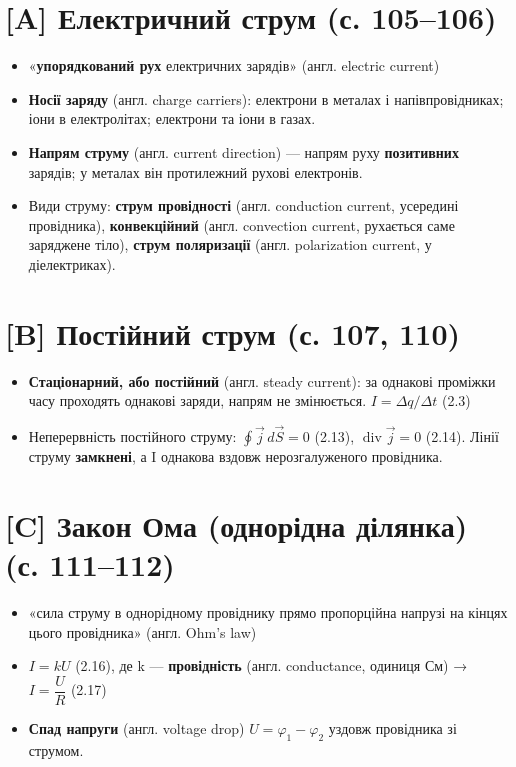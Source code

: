 \documentclass[11pt,a4paper,oneside]{book}
\begin{document}
\section*{[A] Електричний струм (с. 105–106)}
\begin{itemize}
\item «\textbf{упорядкований рух} електричних зарядів» (англ. electric current)
\item \textbf{Носії заряду} (англ. charge carriers): електрони в металах і напівпровідниках; іони в електролітах; електрони та іони в газах.
\item \textbf{Напрям струму} (англ. current direction) — напрям руху \textbf{позитивних} зарядів; у металах він протилежний рухові електронів.
\item Види струму: \textbf{струм провідності} (англ. conduction current, усередині провідника), \textbf{конвекційний} (англ. convection current, рухається саме заряджене тіло), \textbf{струм поляризації} (англ. polarization current, у діелектриках).
\end{itemize}

\section*{[B] Постійний струм (с. 107, 110)}
\begin{itemize}
\item \textbf{Стаціонарний, або постійний} (англ. steady current): за однакові проміжки часу проходять однакові заряди, напрям не змінюється. $I = \Delta q/\Delta t$ (2.3)
\item Неперервність постійного струму: $\oint \vec j\,d\vec S = 0$ (2.13), $\operatorname{div}\vec j = 0$ (2.14). Лінії струму \textbf{замкнені}, а I однакова вздовж нерозгалуженого провідника.
\end{itemize}

\section*{[C] Закон Ома (однорідна ділянка) (с. 111–112)}
\begin{itemize}
\item «сила струму в однорідному провіднику прямо пропорційна напрузі на кінцях цього провідника» (англ. Ohm's law)
\item $I = kU$ (2.16), де k — \textbf{провідність} (англ. conductance, одиниця См) → $I = \dfrac{U}{R}$ (2.17)
\item \textbf{Спад напруги} (англ. voltage drop) $U = \varphi_1-\varphi_2$ уздовж провідника зі струмом.
\end{itemize}
\end{document}
